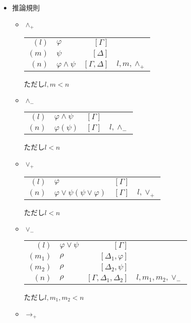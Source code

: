 \documentclass[10pt,b5paper,papersize,dvipdfmx]{jsbook}
\begin{document}
\begin{itemize}
\item 推論規則
\begin{itemize}
\item $\land_+$
\begin{table}[H]
\begin{center}
\begin{tabular}{rlrl}
$(l)$&$\varphi$&$[\Gamma]$& \\
$(m)$&$\psi$&$[\Delta]$& \\
$(n)$&$\varphi \land \psi$&$[\Gamma,\Delta]$&$l,m,\land_+$
\end{tabular}
\end{center}
\end{table}
ただし$l,m<n$
\item $\land_-$
\begin{table}[H]
\begin{center}
\begin{tabular}{rlrl}
$(l)$&$\varphi \land \psi$&$[\Gamma]$& \\
$(n)$&$\varphi (\psi)$&$[\Gamma]$&$l,\land_-$ \\
\end{tabular}
\end{center}
\end{table}
ただし$l<n$
\item $\lor_+$
\begin{table}[H]
\begin{center}
\begin{tabular}{rlrl}
$(l)$&$\varphi$&$[\Gamma]$& \\
$(n)$&$\varphi \lor \psi (\psi \lor \varphi)$&$[\Gamma]$&$l,\lor_+$
\end{tabular}
\end{center}
\end{table}
ただし$l<n$
\item $\lor_-$
\begin{table}[H]
\begin{center}
\begin{tabular}{rlrl}
$(l)$&$\varphi \lor \psi$&$[\Gamma]$& \\
$(m_1)$&$\rho$&$[\Delta_1,\varphi]$& \\
$(m_2)$&$\rho$&$[\Delta_2,\psi]$& \\
$(n)$&$\rho$&$[\Gamma,\Delta_1,\Delta_2]$&$l,m_1,m_2,\lor_-$
\end{tabular}
\end{center}
\end{table}
ただし$l,m_1,m_2<n$
\item $\to_+$

\end{itemize}
\end{itemize}
\end{document}
